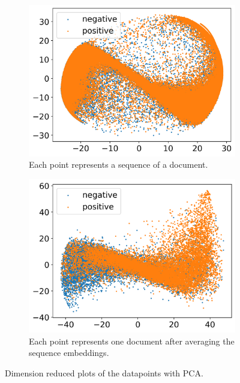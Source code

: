 \begin{figure}[h]
    \begin{subfigure}{0.5\textwidth}
        \centering
        \includegraphics[width=\textwidth]{figures/pca_scatter_sequence_level.png}
        \caption{Each point represents a sequence of a document.}
        \label{figure:pca_sequence}
    \end{subfigure}
    \begin{subfigure}{0.5\textwidth}
        \centering
        \includegraphics[width=\textwidth]{figures/pca_scatter_document_level.png}
        \caption{Each point represents one document after averaging the sequence embeddings.}
        \label{figure:pca_document}
    \end{subfigure}
    \caption{Dimension reduced plots of the datapoints with \ac{PCA}.}
    \label{figure:pca}
\end{figure}

